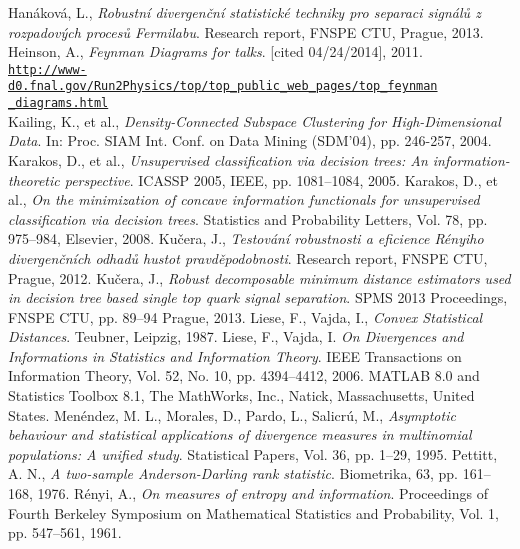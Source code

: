\begin{thebibliography}{10}
  Hanáková, L., {\em Robustní divergenční statistické techniky pro separaci signálů z rozpadových procesů Fermilabu}. Research report, FNSPE CTU, Prague, 2013.
Heinson, A., {\em Feynman Diagrams for talks}. [cited 04/24/2014], 2011. \\ \href{http://www-d0.fnal.gov/Run2Physics/top/top_public_web_pages/top_feynman_diagrams.html}{\texttt{http://www-d0.fnal.gov/Run2Physics/top/top\_public\_web\_pages/top\_feynman}} \\
\href{http://www-d0.fnal.gov/Run2Physics/top/top_public_web_pages/top_feynman_diagrams.html}{\texttt{\_diagrams.html}}\\
 Kailing, K., et al., {\em Density-Connected Subspace Clustering for High-Dimensional Data}. In: Proc. SIAM Int. Conf. on Data Mining (SDM'04), pp. 246-257, 2004.
 Karakos, D., et al., {\em Unsupervised classification via decision trees: An information-theoretic perspective}. ICASSP 2005, IEEE, pp. 1081--1084, 2005.
 Karakos, D., et al., {\em On the minimization of concave information functionals for unsupervised classification via decision trees}. Statistics and Probability Letters, Vol. 78, pp. 975--984,  Elsevier, 2008.
Ku\v cera, J., {\em Testov\' an\'i robustnosti a eficience R\' enyiho divergen\v cn\' ich odhad\r u hustot pravd\v epodobnosti}. Research report, FNSPE CTU, Prague, 2012.
Ku\v cera, J., {\em Robust \ren decomposable minimum distance estimators used in decision tree based single top quark  signal separation}. SPMS 2013 Proceedings, FNSPE CTU, pp. 89--94 Prague, 2013.
Liese, F., Vajda, I., {\em Convex Statistical Distances}. Teubner, Leipzig, 1987.
Liese, F., Vajda, I. {\em On Divergences and Informations in Statistics and Information Theory}. IEEE Transactions on Information Theory, Vol. 52, No. 10, pp. 4394--4412, 2006.
 MATLAB 8.0 and Statistics Toolbox 8.1, The MathWorks, Inc., Natick, Massachusetts, United States.
 Men\'endez, M. L., Morales, D., Pardo, L., Salicr\'u, M., {\em Asymptotic behaviour and statistical applications of divergence measures in multinomial populations: A unified study}. Statistical Papers, Vol. 36, pp. 1--29, 1995.
Pettitt, A. N., {\em A two-sample Anderson-Darling rank statistic}. Biometrika, 63, pp. 161--168, 1976.
 R\'enyi, A., {\em On measures of entropy and information}. Proceedings of Fourth Berkeley Symposium on Mathematical Statistics and Probability, Vol. 1, pp. 547--561, 1961.

\end{thebibliography}
